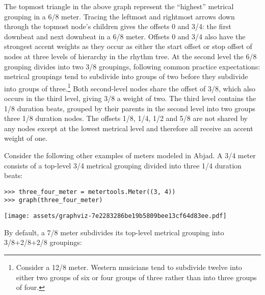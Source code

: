 The topmost triangle in the above graph represent the \enquote{highest}
metrical grouping in a 6/8 meter. Tracing the leftmost and rightmost arrows
down through the topmost node's children gives the offsets 0 and 3/4: the first
downbeat and next downbeat in a 6/8 meter. Offsets 0 and 3/4 also have the
strongest accent weights as they occur as either the start offset or stop
offset of nodes at three levels of hierarchy in the rhythm tree. At the second
level the 6/8 grouping divides into two 3/8 groupings, following common
practice expectations: metrical groupings tend to subdivide into groups of two
before they subdivide into groups of three.\footnote{Consider a 12/8 meter.
Western musicians tend to subdivide twelve into either two groups of six or
four groups of three rather than into three groups of four.} Both second-level
nodes share the offset of 3/8, which also occurs in the third level, giving 3/8
a weight of two. The third level contains the 1/8 duration beats, grouped by
their parents in the second level into two groups three 1/8 duration nodes. The
offsets 1/8, 1/4, 1/2 and 5/8 are not shared by any nodes except at the lowest
metrical level and therefore all receive an accent weight of one.

Consider the following other examples of meters modeled in Abjad. A 3/4 meter
consists of a top-level 3/4 metrical grouping divided into three 1/4 duration
beats:

\begin{comment}
<abjad>
three_four_meter = metertools.Meter((3, 4))
graph(three_four_meter)
</abjad>
\end{comment}

\begin{abjadbookoutput}
\begin{singlespacing}
\vspace{-0.5\baselineskip}
\begin{lstlisting}
>>> three_four_meter = metertools.Meter((3, 4))
>>> graph(three_four_meter)
\end{lstlisting}
\noindent\texttt{[image: assets/graphviz-7e2283286be19b5809bee13cf64d83ee.pdf]}
\end{singlespacing}
\end{abjadbookoutput}

\noindent By default, a 7/8 meter subdivides its top-level metrical grouping
into 3/8+2/8+2/8 groupings:

\begin{comment}
<abjad>
seven_eight_meter = metertools.Meter((7, 8))
graph(seven_eight_meter)
</abjad>
\end{comment}

